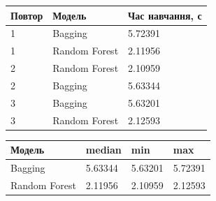 
\Needspace{19.2pt}


\Needspace{108pt}
\begingroup\fontsize{7.5}{9.5}\selectfont\setlength{\tabcolsep}{2.5mm}\renewcommand{\arraystretch}{1.12}\par\noindent\begin{tabular}{|lll|}
\hline
Повтор & Модель & Час навчання, с \\
\hline
1 & Bagging & 5.72391 \\
1 & Random Forest & 2.11956 \\
2 & Random Forest & 2.10959 \\
2 & Bagging & 5.63344 \\
3 & Bagging & 5.63201 \\
3 & Random Forest & 2.12593 \\
\hline
\end{tabular}
\par\endgroup


\Needspace{56pt}
\begingroup\fontsize{7.5}{9.5}\selectfont\setlength{\tabcolsep}{2.5mm}\renewcommand{\arraystretch}{1.12}\par\noindent\begin{tabular}{|llll|}
\hline
Модель & median & min & max \\
\hline
Bagging & 5.63344 & 5.63201 & 5.72391 \\
Random Forest & 2.11956 & 2.10959 & 2.12593 \\
\hline
\end{tabular}
\par\endgroup


\Needspace{28.4pt}


